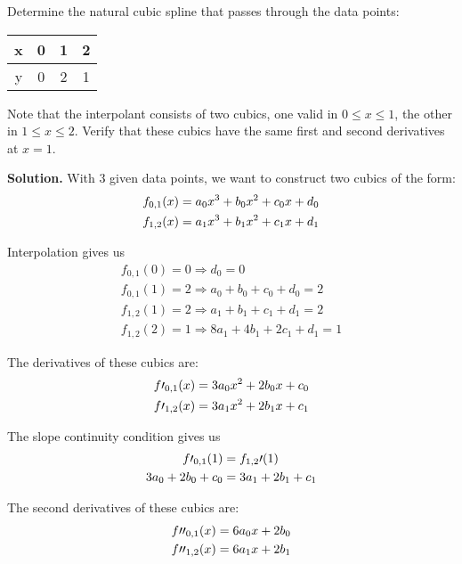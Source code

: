\begin{exercise}{4} %
Determine the natural cubic spline that passes through the data points:\\
\begin{table}[h]
\centering
\begin{tabular}{|c|c|c|c|}
\hline
x & 0 & 1 & 2 \\ \hline
y & 0 & 2 & 1 \\ \hline
\end{tabular}
\end{table}

Note that the interpolant consists of two cubics, one valid in $0 \leq x \leq 1$, the other in $1 \leq x \leq 2$. Verify that these cubics have the same first and second derivatives at $x = 1$.

\textbf{Solution.} With 3 given data points, we want to construct two cubics of the form:
\begin{align}
\notag
f_{0,1}(x) &= a_0x^3 + b_0x^2 + c_0x+d_0\\
\notag
f_{1,2}(x) &= a_1x^3 + b_1x^2 + c_1x+d_1
\end{align}

Interpolation gives us
\begin{align}
f_{0,1}(0) = 0 \Rightarrow d_0 = 0\\
f_{0,1}(1) = 2 \Rightarrow a_0 + b_0 + c_0 + d_0 = 2\\
f_{1,2}(1) = 2 \Rightarrow a_1 + b_1 + c_1 + d_1 = 2\\
f_{1,2}(2) = 1 \Rightarrow 8a_1 + 4b_1 + 2c_1 + d_1 = 1
\end{align}

The derivatives of these cubics are:
\begin{align}
\notag
f\prime_{0,1}(x) &= 3a_0x^2 + 2b_0x + c_0\\
\notag
f\prime_{1,2}(x) &= 3a_1x^2 + 2b_1x + c_1
\end{align}

The slope continuity condition gives us
\begin{align}
\notag
f\prime_{0,1}(1) &= f_{1,2}\prime(1)\\
3a_0 + 2b_0 + c_0 &= 3a_1 + 2b_1 + c_1
\end{align}

The second derivatives of these cubics are:
\begin{align}
\notag
f\prime\prime_{0,1}(x) &= 6a_0x + 2b_0\\
\notag
f\prime\prime_{1,2}(x) &= 6a_1x + 2b_1
\end{align}


\end{exercise}
